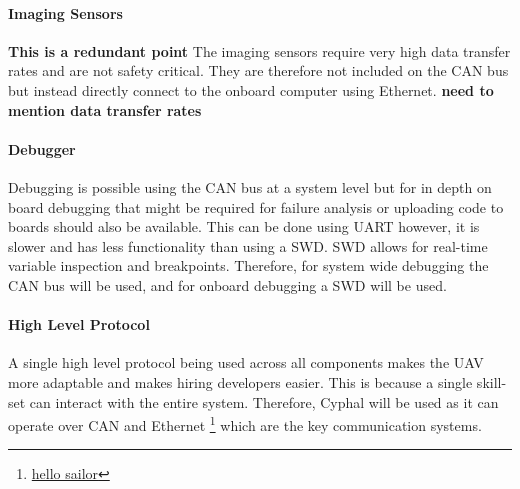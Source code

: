 \paragraph{Imaging Sensors}
\textbf{This is a redundant point}
The imaging sensors require very high data transfer rates and are not safety critical. They are therefore not included on the \gls{CAN} bus but instead directly connect to the onboard computer using Ethernet. \textbf{need to mention data transfer rates}
\paragraph{Debugger}
Debugging is possible using the \gls{CAN} bus at a system level but for in depth on board debugging that might be required for failure analysis or uploading code to boards should also be available. This can be done using \gls{UART} however, it is slower and has less functionality than using a \gls{SWD}. \gls{SWD} allows for real-time variable inspection and breakpoints. Therefore, for system wide debugging the \gls{CAN} bus will be used, and for onboard debugging a \gls{SWD} will be used.
\paragraph{High Level Protocol}
A single high level protocol being used across all components makes the \gls{UAV} more adaptable and makes hiring developers easier. This is because a single skill-set can interact with the entire system. Therefore, Cyphal will be used as it can operate over \gls{CAN} and Ethernet \footnote{\url{hello sailor}} which are the key communication systems. 
